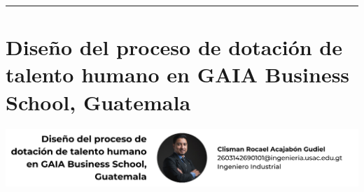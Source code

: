 \documentclass[12pt,spanish,Letterpaper,openany]{book}
\newcommand{\HRule}{\begin{center}\rule{0.5\linewidth}{0.2mm}\end{center}}
\begin{document}
\medskip

\HRule

\medskip

\hypertarget{art05}{%
\chapter{Diseño del proceso de dotación de talento humano en GAIA Business School, Guatemala}\label{art05}}

\begin{center}\includegraphics[width=1\linewidth]{autores/art05} \end{center}
\end{document}
